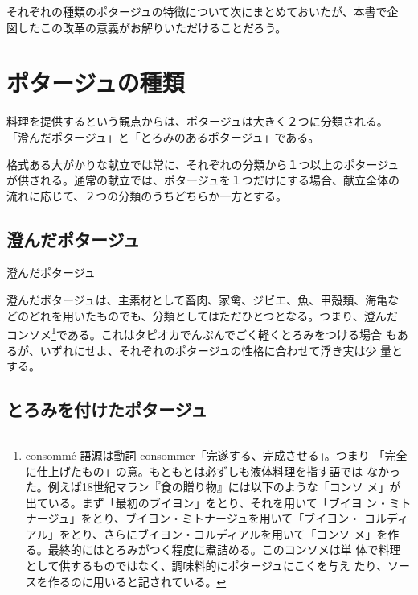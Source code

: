 それぞれの種類のポタージュの特徴について次にまとめておいたが、本書で企
図したこの改革の意義がお解りいただけることだろう。

\hypertarget{classification-des-potages}{%
\section{ポタージュの種類}\label{classification-des-potages}}


料理を提供するという観点からは、ポタージュは大きく２つに分類される。
「澄んだポタージュ」と「とろみのあるポタージュ」である。

格式ある大がかりな献立では常に、それぞれの分類から１つ以上のポタージュ
が供される。通常の献立では、ポタージュを１つだけにする場合、献立全体の
流れに応じて、２つの分類のうちどちらか一方とする。

\hypertarget{classification-potages-claires}{%
\subsection{澄んだポタージュ}\label{classification-potages-claires}}


澄んだポタージュ

澄んだポタージュは、主素材として畜肉、家禽、ジビエ、魚、甲殻類、海亀な
どのどれを用いたものでも、分類としてはただひとつとなる。つまり、澄んだ
コンソメ\footnote{consommé 語源は動詞
  consommer「完遂する、完成させる」。つまり
  「完全に仕上げたもの」の意。もともとは必ずしも液体料理を指す語では
  なかった。例えば18世紀マラン『食の贈り物』には以下のような「コンソ
  メ」が出ている。まず「最初のブイヨン」をとり、それを用いて「ブイヨ
  ン・ミトナージュ」をとり、ブイヨン・ミトナージュを用いて「ブイヨン・
  コルディアル」をとり、さらにブイヨン・コルディアルを用いて「コンソ
  メ」を作る。最終的にはとろみがつく程度に煮詰める。このコンソメは単
  体で料理として供するものではなく、調味料的にポタージュにこくを与え
  たり、ソースを作るのに用いると記されている。}である。これはタピオカでんぷんでごく軽くとろみをつける場合
もあるが、いずれにせよ、それぞれのポタージュの性格に合わせて浮き実は少
量とする。

\hypertarget{classification-potages-lies}{%
\subsection{とろみを付けたポタージュ}\label{classification-potages-lies}}

